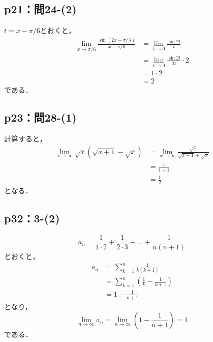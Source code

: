 \documentclass[uplatex,dvipdfmx,a4paper,10pt,fleqn]{jsarticle}
\begin{document}
\subsection*{p21：問24-(2)}

\begin{tleftbar}
    $t = x - \pi/6$とおくと，
    \begin{align*} 
        \lim_{x \to \pi/6} \frac{\sin (2x-\pi/3)}{x - \pi/6} & = \lim_{t \to 0} \frac{\sin 2 t}{t} \\
        & = \lim_{t \to 0} \frac{\sin 2t}{2t} \cdot 2 \\
        & = 1 \cdot 2 \\
        & = 2 
    \end{align*} 
    である．
\end{tleftbar}




\subsection*{p23：問28-(1)}

\begin{tleftbar}
    計算すると，
    \begin{align*} 
        \lim_{x \to \infty} \sqrt{x}(\sqrt{x+1}-\sqrt{x}) & = \lim_{x \to \infty} \frac{\sqrt{x}}{\sqrt{x+1}+\sqrt{x}} \\
        & = \frac{1}{1+1} \\
        & = \frac{1}{2}
    \end{align*}
    となる．
\end{tleftbar}


\subsection*{p32：3-(2)}

\begin{tleftbar}
    \[
        a_n = \frac{1}{1 \cdot 2}+\frac{1}{2 \cdot 3} + \dots + \frac{1}{n(n+1)}
    \]
    とおくと，
    \begin{align*} 
       a_n & =  \sum_{k=1}^{n} \frac{1}{k(k+1)} \\
       & = \sum_{k=1}^{n} \left ( \frac{1}{k} - \frac{1}{k+1} \right ) \\
       & = 1-\frac{1}{n+1}
    \end{align*} 
    となり，
    \[
        \lim_{n \to \infty} a_n = \lim_{n \to \infty} \left ( 1-\frac{1}{n+1} \right) =1
    \]
    である．
\end{tleftbar}
\end{document}
